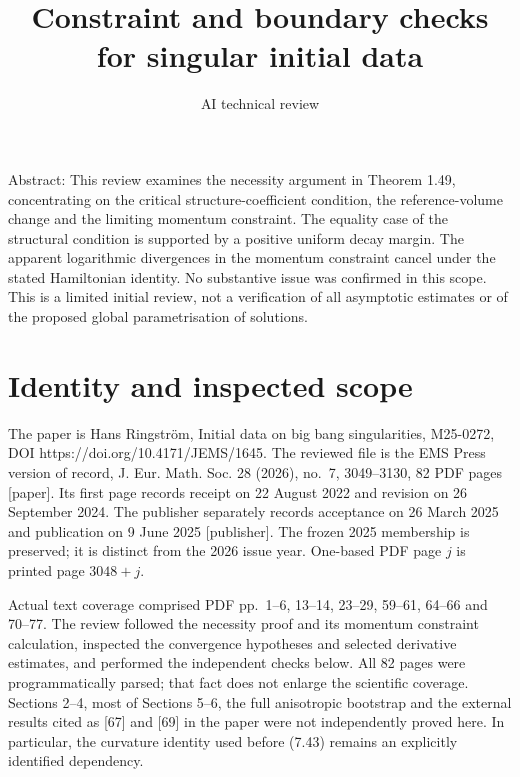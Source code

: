 \documentclass[10pt]{article}
\title{Constraint and boundary checks for singular initial data}
\author{AI technical review}
\date{}
\begin{document}
\maketitle
Abstract: This review examines the necessity argument in Theorem 1.49, concentrating on the critical structure-coefficient condition, the reference-volume change and the limiting momentum constraint. The equality case of the structural condition is supported by a positive uniform decay margin. The apparent logarithmic divergences in the momentum constraint cancel under the stated Hamiltonian identity. No substantive issue was confirmed in this scope. This is a limited initial review, not a verification of all asymptotic estimates or of the proposed global parametrisation of solutions.\par
\section*{Identity and inspected scope}
The paper is Hans Ringström, Initial data on big bang singularities, M25-0272, DOI https://doi.org/10.4171/JEMS/1645. The reviewed file is the EMS Press version of record, J. Eur. Math. Soc. 28 (2026), no. 7, 3049–3130, 82 PDF pages [paper]. Its first page records receipt on 22 August 2022 and revision on 26 September 2024. The publisher separately records acceptance on 26 March 2025 and publication on 9 June 2025 [publisher]. The frozen 2025 membership is preserved; it is distinct from the 2026 issue year. One-based PDF page \(j\) is printed page \(3048+j\).\par
Actual text coverage comprised PDF pp. 1–6, 13–14, 23–29, 59–61, 64–66 and 70–77. The review followed the necessity proof and its momentum constraint calculation, inspected the convergence hypotheses and selected derivative estimates, and performed the independent checks below. All 82 pages were programmatically parsed; that fact does not enlarge the scientific coverage. Sections 2–4, most of Sections 5–6, the full anisotropic bootstrap and the external results cited as [67] and [69] in the paper were not independently proved here. In particular, the curvature identity used before (7.43) remains an explicitly identified dependency.\par
\end{document}
